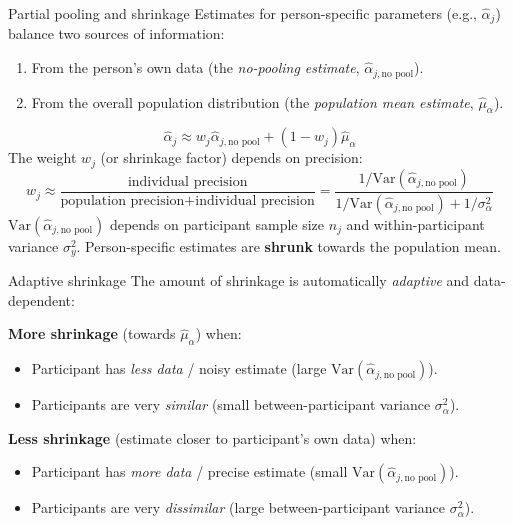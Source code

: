 \documentclass[aspectratio=169]{beamer}
\begin{document}
\begin{frame}{Partial pooling and shrinkage}
    Estimates for person-specific parameters (e.g., $\hat{\alpha}_j$) balance two sources of information:
    \pause
    \begin{enumerate}
        \item From the person's own data (the \emph{no-pooling estimate}, $\hat{\alpha}_{j, \text{no pool}}$).
        \item From the overall population distribution (the \emph{population mean estimate}, $\hat{\mu}_{\alpha}$).
    \end{enumerate}
    \pause
    $$\hat{\alpha}_j \approx w_j \hat{\alpha}_{j, \text{no pool}} + (1-w_j) \hat{\mu}_{\alpha} $$
    \pause
    The weight $w_j$ (or shrinkage factor) depends on precision:\\
    \pause
    $$ w_j \approx \frac{\text{individual precision}}{\text{population precision} + \text{individual precision}} = \frac{1 / \text{Var}(\hat{\alpha}_{j, \text{no pool}})}{1 / \text{Var}(\hat{\alpha}_{j, \text{no pool}}) + 1 / \sigma^2_{\alpha}} $$
    \pause
    $\text{Var}(\hat{\alpha}_{j, \text{no pool}})$ depends on participant sample size $n_j$ and within-participant variance $\sigma^2_y$.
    Person-specific estimates are \textbf{shrunk} towards the population mean.
\end{frame}

\begin{frame}{Adaptive shrinkage}
    The amount of shrinkage is automatically \emph{adaptive} and data-dependent:

    \textbf{More shrinkage} (towards $\hat{\mu}_{\alpha}$) when:
    \begin{itemize}
        \item Participant has \emph{less data} / noisy estimate (large $\text{Var}(\hat{\alpha}_{j, \text{no pool}})$).
        \item Participants are very \emph{similar} (small between-participant variance $\sigma^2_{\alpha}$).
    \end{itemize}
    \pause
    \medskip
    \textbf{Less shrinkage} (estimate closer to participant's own data) when:
    \begin{itemize}
        \item Participant has \emph{more data} / precise estimate (small $\text{Var}(\hat{\alpha}_{j, \text{no pool}})$).
        \item Participants are very \emph{dissimilar} (large between-participant variance $\sigma^2_{\alpha}$).
    \end{itemize}
\end{frame}
\end{document}
